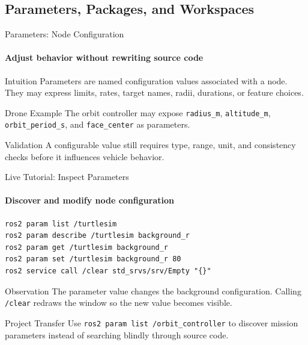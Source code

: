 \subsection{Parameters, Packages, and Workspaces}

\begin{frame}{Parameters: Node Configuration}
\framesubtitle{Adjust behavior without rewriting source code}
\begin{block}{Intuition}
Parameters are named configuration values associated with a node. They may express limits, rates, target names, radii, durations, or feature choices.
\end{block}
\begin{exampleblock}{Drone Example}
The orbit controller may expose \texttt{radius\_m}, \texttt{altitude\_m}, \texttt{orbit\_period\_s}, and \texttt{face\_center} as parameters.
\end{exampleblock}
\begin{alertblock}{Validation}
A configurable value still requires type, range, unit, and consistency checks before it influences vehicle behavior.
\end{alertblock}
\end{frame}

\begin{frame}[fragile]{Live Tutorial: Inspect Parameters}
\framesubtitle{Discover and modify node configuration}
\begin{verbatim}
ros2 param list /turtlesim
ros2 param describe /turtlesim background_r
ros2 param get /turtlesim background_r
ros2 param set /turtlesim background_r 80
ros2 service call /clear std_srvs/srv/Empty "{}"
\end{verbatim}
\begin{exampleblock}{Observation}
The parameter value changes the background configuration. Calling \texttt{/clear} redraws the window so the new value becomes visible.
\end{exampleblock}
\begin{block}{Project Transfer}
Use \texttt{ros2 param list /orbit\_controller} to discover mission parameters instead of searching blindly through source code.
\end{block}
\end{frame}

